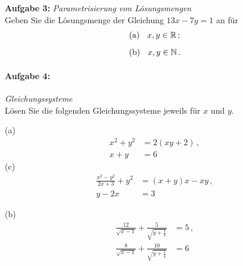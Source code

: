 \newpage
% 
\textbf{Aufgabe 3: } \emph{Parametrisierung von Lösungsmengen}\\[0.2cm]
Geben Sie die Lösungsmenge der Gleichung $13x-7y=1$ an für
\begin{align*}
&\text{(a) } \hspace{0.2cm} x,y\in\mathbb{R}\,;\\[0.2cm]
&\text{(b) } \hspace{0.2cm} x,y\in\mathbb{N}\,.
\end{align*}

\paragraph{Aufgabe 4: } \emph{Gleichungssysteme}\\[0.2cm]
Lösen Sie die folgenden Gleichungssysteme jeweils für $x$ und $y$.\\[0.5cm]
\begin{minipage}[t]{0.45\linewidth}
(a)\vspace{-2.7em}
\begin{align*}
    x^2+y^2&=2(xy+2)\,,\\ x+y&=6
\end{align*}
(c)\vspace{-2,7em}
\begin{align*}
    \frac{x^2-y^2}{2x+3}+y^2&=(x+y)x-xy\,,\\
    y-2x&=3
\end{align*}
\end{minipage}\hfill
\begin{minipage}[t]{0.4\linewidth}
(b)\vspace{-2.7em}
\begin{align*}
    \frac{12}{\sqrt{x-1}}+\frac{5}{\sqrt{y+\frac{1}{4}}}&=5\,,\\ \frac{8}{\sqrt{x-1}}+\frac{10}{\sqrt{y+\frac{1}{4}}}&=6
\end{align*}
\end{minipage}
%
